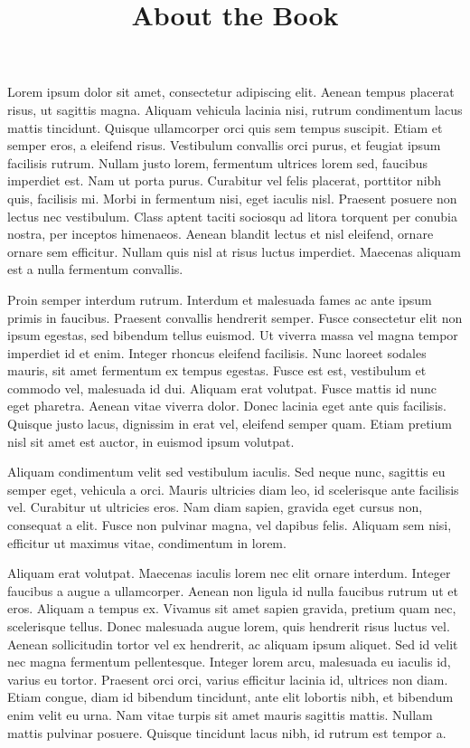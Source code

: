 \documentclass{article}
\begin{document}
\title{About the Book}

\maketitle


Lorem ipsum dolor sit amet, consectetur adipiscing elit. Aenean tempus placerat risus, ut sagittis magna. Aliquam vehicula lacinia nisi, rutrum condimentum lacus mattis tincidunt. Quisque ullamcorper orci quis sem tempus suscipit. Etiam et semper eros, a eleifend risus. Vestibulum convallis orci purus, et feugiat ipsum facilisis rutrum. Nullam justo lorem, fermentum ultrices lorem sed, faucibus imperdiet est. Nam ut porta purus. Curabitur vel felis placerat, porttitor nibh quis, facilisis mi. Morbi in fermentum nisi, eget iaculis nisl. Praesent posuere non lectus nec vestibulum. Class aptent taciti sociosqu ad litora torquent per conubia nostra, per inceptos himenaeos. Aenean blandit lectus et nisl eleifend, ornare ornare sem efficitur. Nullam quis nisl at risus luctus imperdiet. Maecenas aliquam est a nulla fermentum convallis.


Proin semper interdum rutrum. Interdum et malesuada fames ac ante ipsum primis in faucibus. Praesent convallis hendrerit semper. Fusce consectetur elit non ipsum egestas, sed bibendum tellus euismod. Ut viverra massa vel magna tempor imperdiet id et enim. Integer rhoncus eleifend facilisis. Nunc laoreet sodales mauris, sit amet fermentum ex tempus egestas. Fusce est est, vestibulum et commodo vel, malesuada id dui. Aliquam erat volutpat. Fusce mattis id nunc eget pharetra. Aenean vitae viverra dolor. Donec lacinia eget ante quis facilisis. Quisque justo lacus, dignissim in erat vel, eleifend semper quam. Etiam pretium nisl sit amet est auctor, in euismod ipsum volutpat.


Aliquam condimentum velit sed vestibulum iaculis. Sed neque nunc, sagittis eu semper eget, vehicula a orci. Mauris ultricies diam leo, id scelerisque ante facilisis vel. Curabitur ut ultricies eros. Nam diam sapien, gravida eget cursus non, consequat a elit. Fusce non pulvinar magna, vel dapibus felis. Aliquam sem nisi, efficitur ut maximus vitae, condimentum in lorem.


Aliquam erat volutpat. Maecenas iaculis lorem nec elit ornare interdum. Integer faucibus a augue a ullamcorper. Aenean non ligula id nulla faucibus rutrum ut et eros. Aliquam a tempus ex. Vivamus sit amet sapien gravida, pretium quam nec, scelerisque tellus. Donec malesuada augue lorem, quis hendrerit risus luctus vel. Aenean sollicitudin tortor vel ex hendrerit, ac aliquam ipsum aliquet. Sed id velit nec magna fermentum pellentesque. Integer lorem arcu, malesuada eu iaculis id, varius eu tortor. Praesent orci orci, varius efficitur lacinia id, ultrices non diam. Etiam congue, diam id bibendum tincidunt, ante elit lobortis nibh, et bibendum enim velit eu urna. Nam vitae turpis sit amet mauris sagittis mattis. Nullam mattis pulvinar posuere. Quisque tincidunt lacus nibh, id rutrum est tempor a.
\end{document}
